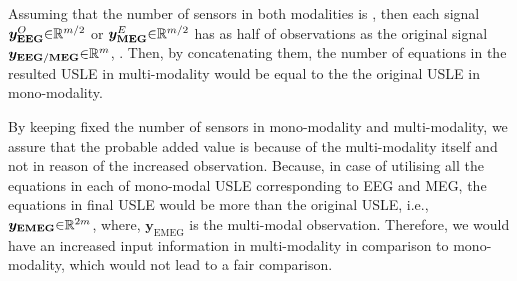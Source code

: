 Assuming that the number of sensors in both modalities is , then each signal $\boldsymbol{y}_{\boldsymbol{\mathrm{EEG}}}^{O} {\in} \mathbb{R}^{m/2}$ or $\boldsymbol{y}_{\boldsymbol{\mathrm{MEG}}}^{E} {\in} \mathbb{R}^{m/2}$ has as half of observations as the original signal $\boldsymbol{y}_{\boldsymbol{\mathrm{EEG}}/\boldsymbol{\mathrm{MEG}}} {\in} \mathbb{R}^{m}$, .
Then, by concatenating them, the number of equations in the resulted USLE in multi-modality would be equal to the the original USLE in mono-modality.

By keeping fixed the number of sensors in mono-modality and multi-modality, we assure that the probable added value is because of the multi-modality itself and not in reason of the increased observation.
Because, in case of utilising all the equations in each of mono-modal USLE corresponding to EEG and MEG, the equations in final USLE  would be more than the original USLE, i.e., $\boldsymbol{y}_{\boldsymbol{\mathrm{EMEG}}} {\in} \mathbb{R}^{2m}$, where, $\boldsymbol{y}_{\boldsymbol{\mathrm{EMEG}}}$ is the multi-modal observation.
Therefore, we would have an increased input information in multi-modality in comparison to mono-modality, which would not lead to a fair comparison.